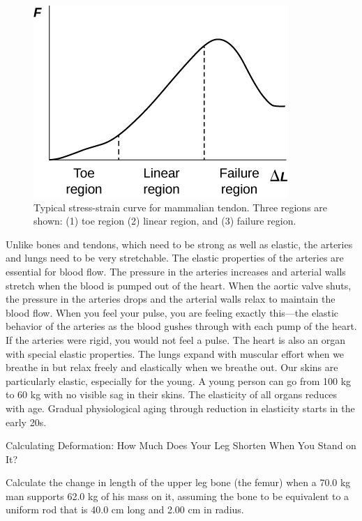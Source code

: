 \documentclass[
]{book}
\begin{document}
\begin{figure}
\hypertarget{import-auto-id1165296334455}{%
\centering
\includegraphics{images/Figure_06_03_05_xa.jpg}
\caption{Typical stress-strain curve for mammalian tendon. Three regions are
shown: (1) toe region (2) linear region, and (3) failure
region.}\label{import-auto-id1165296334455}
}
\end{figure}

Unlike bones and tendons, which need to be strong as well as elastic,
the arteries and lungs need to be very stretchable. The elastic
properties of the arteries are essential for blood flow. The pressure in
the arteries increases and arterial walls stretch when the blood is
pumped out of the heart. When the aortic valve shuts, the pressure in
the arteries drops and the arterial walls relax to maintain the blood
flow. When you feel your pulse, you are feeling exactly this---the
elastic behavior of the arteries as the blood gushes through with each
pump of the heart. If the arteries were rigid, you would not feel a
pulse. The heart is also an organ with special elastic properties. The
lungs expand with muscular effort when we breathe in but relax freely
and elastically when we breathe out. Our skins are particularly elastic,
especially for the young. A young person can go from 100 kg to 60 kg
with no visible sag in their skins. The elasticity of all organs reduces
with age. Gradual physiological aging through reduction in elasticity
starts in the early 20s.

\hypertarget{fs-id1165296715479}{}
Calculating Deformation: How Much Does Your Leg Shorten When You Stand
on It?

Calculate the change in length of the upper leg bone (the femur) when a
70.0 kg man supports 62.0 kg of his mass on it, assuming the bone to be
equivalent to a uniform rod that is 40.0 cm long and 2.00 cm in radius.
\end{document}
